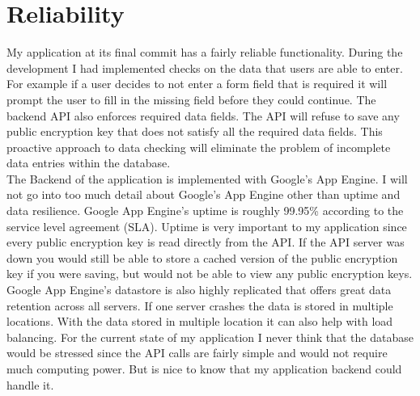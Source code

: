\documentclass[letterpaper,12pt,notitlepage,fleqn]{article}
\begin{document}
\section{Reliability}
\indent My application at its final commit has a fairly reliable functionality. During the development I had implemented checks on the data that users are able to enter. For example if a user decides to not enter a form field that is required it will prompt the user to fill in the missing field before they could continue. The backend API also enforces required data fields. The API will refuse to save any public encryption key that does not satisfy all the required data fields. This proactive
approach to data checking will eliminate the problem of incomplete data entries within the database.
\\
\indent The Backend of the application is implemented with Google's App Engine. I will not go into too much detail about Google's App Engine other than uptime and data resilience. Google App Engine's uptime is roughly 99.95\% according to the service level agreement (SLA). Uptime is very important to my application since every public encryption key is read directly from the API. If the API server was down you would still be able to store a cached version of the public encryption key if you were saving, but would
not be able to view any public encryption keys. Google App Engine's datastore is also highly replicated that offers great data retention across all servers. If one server crashes the data is stored in multiple locations. With the data stored in multiple location it can also help with load balancing. For the current state of my application I never think that the database would be stressed since the API calls are fairly simple and would not require much computing power. But is nice to know that my
application backend could handle it.  
\end{document}
